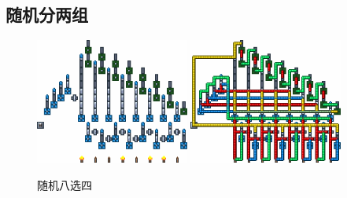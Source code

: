 \subsection{随机分两组}
\begin{figure}
    \centering
    \includegraphics[width=0.45\textwidth]{images/134.png}
    \qquad
    \includegraphics[width=0.45\textwidth]{images/135.png}
    \caption{随机八选四}
\end{figure}
